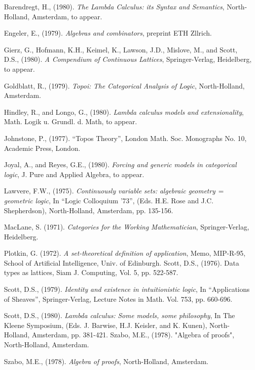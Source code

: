 \begin{thebibliography}{86}

 Barendregt, H., (1980). {\it The Lambda Calculus: its Syntax and
Semantics}, North-Holland, Amsterdam, to appear.

 Engeler, E., (1979).  {\it Algebras and combinators}, preprint ETH Zllrich.

 Gierz, G., Hofmann, K.H., Keimel, K., Lawson, J.D., Mislove, M., and Scott,
D.S., (1980). {\it A Compendium of Continuous Lattices}, Springer-Verlag, Heidelberg, to
appear.

 Goldblatt, R., (1979). {\it Topoi: The Categorical Analysis of Logic},
North-Holland, Amsterdam.

 Hindley, R., and Longo, G., (1980). {\it Lambda calculus models and
extensionality}, Math. Logik u. Grundl. d. Math, to appear.

Johnstone, P., (1977). ``Topos Theory'', London Math. Soc. Monographs No.
10, Academic Press, London.

 Joyal, A., and Reyes, G.E., (1980). {\it Forcing and generic models in
categorical logic}, J. Pure and Applied Algebra, to appear.

 Lawvere, F.W., (1975). {\it Continuously variable sets: algebraic
geometry$\,=\,$geometric logic}, In ``Logic Colloquium '73'', (Eds. H.E. Rose and J.C.
Shepherdson), North-Holland, Amsterdam, pp. 135-156.

 MacLane, S. (1971). {\it Categories for the Working Mathematician},
Springer-Verlag, Heidelberg.

 Plotkin, G. (1972). {\it A set-theoretical definition of application},
Memo, MIP-R-95, School of Artificial Intelligence, Univ. of Edinburgh. Scott, D.S.,
(1976). Data types as lattices, Siam J. Computing, Vol. 5, pp. 522-587.

 Scott, D.S., (1979). {\it Identity and existence in intuitionistic
logic}, In ``Applications of Sheaves'', Springer-Verlag, Lecture Notes in Math. Vol. 753,
pp. 660-696.

 Scott, D.S., (1980). {\it Lambda calculus: Some models, some philosophy},
In The Kleene Symposium, (Eds. J. Barwise, H.J. Keisler, and K. Kunen), North-Holland,
Amsterdam, pp. 381-421. Szabo, M.E., (1978). "Algebra of proofs", North-Holland,
Amsterdam.

 Szabo, M.E., (1978). {\it Algebra of proofs}, North-Holland, Amsterdam.

\end{thebibliography}
